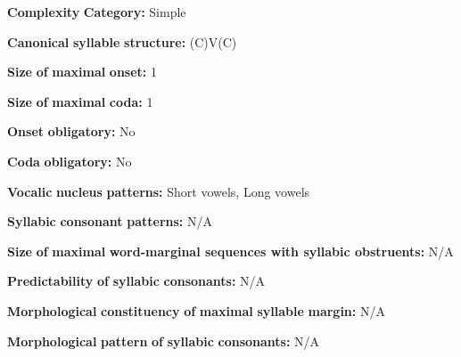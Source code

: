 \documentclass[output=paper]{langsci/langscibook}
\begin{document}
\begin{styleBody}
\textbf{Complexity} \textbf{Category:} Simple
\end{styleBody}

\begin{styleBody}
\textbf{Canonical} \textbf{syllable} \textbf{structure:} (C)V(C) \citep[21-22]{Yumitani1998}
\end{styleBody}

\begin{styleBody}
\textbf{Size} \textbf{of} \textbf{maximal} \textbf{onset:} 1
\end{styleBody}

\begin{styleBody}
\textbf{Size} \textbf{of} \textbf{maximal} \textbf{coda:} 1
\end{styleBody}

\begin{styleBody}
\textbf{Onset} \textbf{obligatory:} No
\end{styleBody}

\begin{styleBody}
\textbf{Coda} \textbf{obligatory:} No
\end{styleBody}

\begin{styleBody}
\textbf{Vocalic} \textbf{nucleus} \textbf{patterns:} Short vowels, Long vowels
\end{styleBody}

\begin{styleBody}
\textbf{Syllabic} \textbf{consonant} \textbf{patterns:} N/A
\end{styleBody}

\begin{styleBody}
\textbf{Size} \textbf{of} \textbf{maximal} \textbf{word{}-marginal sequences with syllabic obstruents:} N/A
\end{styleBody}

\begin{styleBody}
\textbf{Predictability} \textbf{of} \textbf{syllabic} \textbf{consonants:} N/A
\end{styleBody}

\begin{styleBody}
\textbf{Morphological} \textbf{constituency} \textbf{of} \textbf{maximal} \textbf{syllable} \textbf{margin:} N/A
\end{styleBody}

\begin{styleBody}
\textbf{Morphological} \textbf{pattern} \textbf{of} \textbf{syllabic} \textbf{consonants:} N/A
\end{styleBody}
\end{document}
